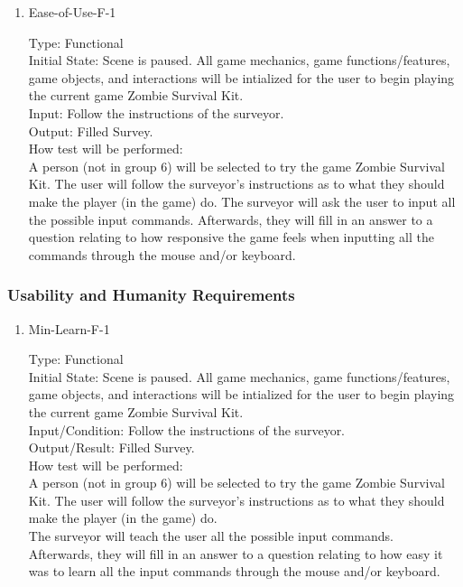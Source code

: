 \documentclass[12pt, titlepage]{article}
\begin{document}
\begin{enumerate}
	\item{Ease-of-Use-F-1\\}
	
	Type: Functional \\
	
	Initial State: Scene is paused. All game mechanics, game functions/features, game objects, and interactions will be intialized for the user to begin playing the current game Zombie Survival Kit. \\
	
	Input: Follow the instructions of the surveyor. \\
	
	Output: Filled Survey. \\
	
	How test will be performed:\\ A person (not in group 6) will be selected to try the game Zombie Survival Kit. The user will follow the surveyor's instructions as to what they should make the player (in the game) do. 
	The surveyor will ask the user to input all the possible input commands.
	Afterwards, they will fill in an answer to a question relating to how responsive the game feels when inputting all the commands through the mouse and/or keyboard.\\
	
\end{enumerate}

\subsubsection{Usability and Humanity Requirements}

\begin{enumerate}
	
	\item{Min-Learn-F-1\\}
	
	Type: Functional \\
	
	Initial State: Scene is paused. All game mechanics, game functions/features, game objects, and interactions will be intialized for the user to begin playing the current game Zombie Survival Kit. \\
	
	Input/Condition: Follow the instructions of the surveyor. \\
	
	Output/Result: Filled Survey. \\
	
	How test will be performed:\\ A person (not in group 6) will be selected to try the game Zombie Survival Kit. The user will follow the surveyor's instructions as to what they should make the player (in the game) do. \\
	The surveyor will teach the user all the possible input commands. \\
	Afterwards, they will fill in an answer to a question relating to how easy it was to learn all the input commands through the mouse and/or keyboard.\\				
	
\end{enumerate}
\end{document}
